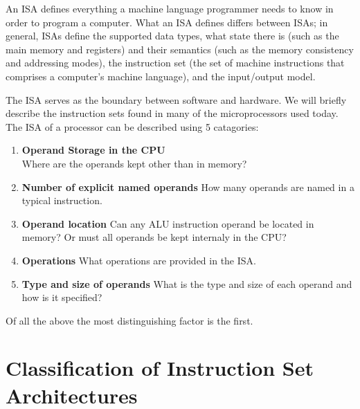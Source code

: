 \documentclass[12pt]{report}
\begin{document}
An ISA defines everything a machine language programmer needs to know in order to program a computer. What an ISA defines differs between ISAs; in general, ISAs define the supported data types, what state there is (such as the main memory and registers) and their semantics (such as the memory consistency and addressing modes), the instruction set (the set of machine instructions that comprises a computer's machine language), and the input/output model.

The ISA serves as the boundary between software and hardware. We will briefly describe the instruction sets found in many of the microprocessors used today. The ISA of a processor can be described using 5 catagories:
\begin{enumerate}
\item \textbf{Operand Storage in the CPU}\\
Where are the operands kept other than in memory?
\item \textbf{Number of explicit named operands}
How many operands are named in a typical instruction.
\item \textbf{Operand location}
Can any ALU instruction operand be located in memory? Or must all operands be kept internaly in the CPU?
\item \textbf{Operations}
What operations are provided in the ISA.
\item \textbf{Type and size of operands}
What is the type and size of each operand and how is it specified?
\end{enumerate}
Of all the above the most distinguishing factor is the first. 

\section{Classification of Instruction Set Architectures}
\end{document}
